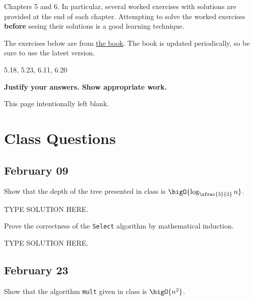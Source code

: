 \documentclass[draft]{article}
\begin{document}
\begin{titlepage}
    \begin{tcolorbox}[title=Reading,fonttitle=\bfseries]
        Chapters 5 and 6. In particular, several worked exercises with solutions are provided at the end of each chapter. Attempting to solve the worked exercises \textbf{before} seeing their solutions is a good learning technique.
    \end{tcolorbox}
    The exercises below are from \href{https://sites.google.com/site/gopalpandurangan/home/algorithms-course}{the book}. The book is updated periodically, so be sure to use the latest version.

    \begin{tcolorbox}[title=Exercises,fonttitle=\bfseries]
        5.18, 5.23, 6.11, 6.20
    \end{tcolorbox}

    \textbf{Justify your answers. Show appropriate work.}
\end{titlepage}
\vspace*{\fill}\begin{center}{\Huge This page intentionally left blank.}\end{center}\vspace*{\fill}\thispagestyle{empty}\clearpage
{}

\section{Class Questions}
\subsection{February 09}

\begin{question}
    Show that the depth of the tree presented in class is $\bigO{\log_{\sfrac{3}{2}}n}$.
\end{question}

\begin{solution}
    TYPE SOLUTION HERE.
\end{solution}

\begin{question}
    Prove the correctness of the \texttt{Select} algorithm by mathematical induction.
\end{question}

\begin{solution}
    TYPE SOLUTION HERE.
\end{solution}

\subsection{February 23}
\begin{question}
    Show that the algorithm \texttt{mult} given in class is $\bigO{n^2}$.
\end{question}
\end{document}
